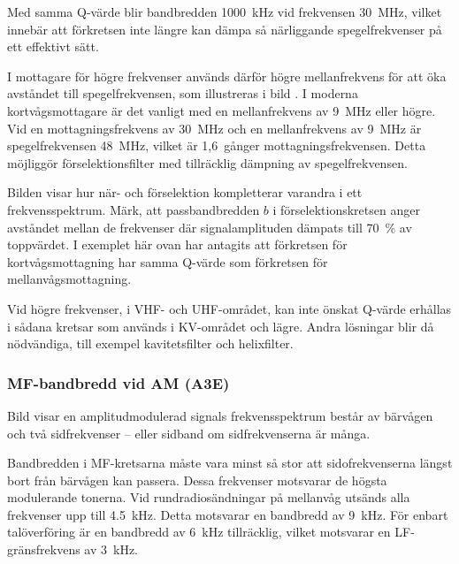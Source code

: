 Med samma Q-värde blir bandbredden \SI{1000}{\kilo\hertz} vid frekvensen
\SI{30}{\mega\hertz}, vilket innebär att förkretsen inte längre kan dämpa så
närliggande spegelfrekvenser på ett effektivt sätt.

\newpage
I mottagare för högre frekvenser används därför högre mellanfrekvens
för att öka avståndet till spegelfrekvensen, som illustreras i bild
.
I moderna kortvågsmottagare är det vanligt med en mellanfrekvens av
\SI{9}{\mega\hertz} eller högre.
Vid en mottagningsfrekvens av \SI{30}{\mega\hertz} och en mellanfrekvens av
\SI{9}{\mega\hertz} är spegelfrekvensen \SI{48}{\mega\hertz}, vilket är
1,6~gånger mottagningsfrekvensen.
Detta möjliggör förselektionsfilter med tillräcklig dämpning av
spegelfrekvensen.


Bilden  visar hur när- och förselektion kompletterar
varandra i ett frekvensspektrum.
Märk, att passbandbredden \(b\) i förselektionskretsen anger avståndet mellan
de frekvenser där signalamplituden dämpats till 70~\% av toppvärdet.
I exemplet här ovan har antagits att förkretsen för kortvågsmottagning har
samma Q-värde som förkretsen för mellanvågsmottagning.

\newpage
Vid högre frekvenser, i VHF- och UHF-området, kan inte önskat Q-värde
erhållas i sådana kretsar som används i KV-området och lägre.
Andra lösningar blir då nödvändiga, till exempel kavitetsfilter och helixfilter.

\newpage %
\subsubsection{MF-bandbredd vid AM (A3E)}


Bild  visar en amplitudmodulerad signals frekvensspektrum
består av bärvågen och två sidfrekvenser -- eller sidband om sidfrekvenserna
är många.

Bandbredden i MF-kretsarna måste vara minst så stor att sidofrekvenserna
längst bort från bärvågen kan passera.
Dessa frekvenser motsvarar de högsta modulerande tonerna.
Vid rundradiosändningar på mellanvåg utsänds alla frekvenser upp till
\SI{4,5}{\kilo\hertz}.
Detta motsvarar en bandbredd av \SI{9}{\kilo\hertz}.
För enbart talöverföring är en bandbredd av \SI{6}{\kilo\hertz} tillräcklig,
vilket motsvarar en LF-gränsfrekvens av \SI{3}{\kilo\hertz}.

